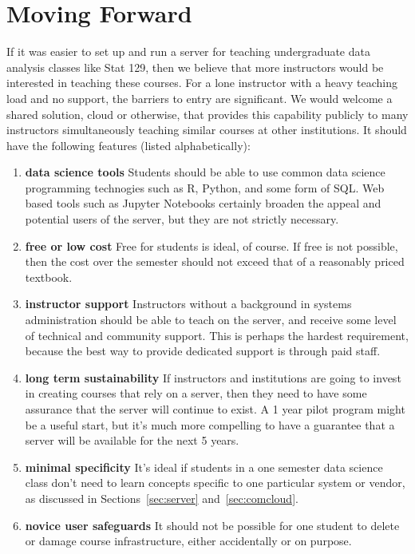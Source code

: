 \documentclass[12pt]{article}
\begin{document}
\section{Moving Forward}

If it was easier to set up and run a server for teaching undergraduate data analysis classes like Stat 129, then we believe that more instructors would be interested in teaching these courses.
For a lone instructor with a heavy teaching load and no support, the barriers to entry are significant.
We would welcome a shared solution, cloud or otherwise, that provides this capability publicly to many instructors simultaneously teaching similar courses at other institutions.
It should have the following features (listed alphabetically):
\begin{enumerate}
\item \textbf{data science tools} Students should be able to use common data science programming technogies such as R, Python, and some form of SQL.
    Web based tools such as Jupyter Notebooks certainly broaden the appeal and potential users of the server, but they are not strictly necessary.
\item \textbf{free or low cost} Free for students is ideal, of course.
    If free is not possible, then the cost over the semester should not exceed that of a reasonably priced textbook.
\item \textbf{instructor support}
    Instructors without a background in systems administration should be able to teach on the server, and receive some level of technical and community support.
    This is perhaps the hardest requirement, because the best way to provide dedicated support is through paid staff.
\item \textbf{long term sustainability} 
    If instructors and institutions are going to invest in creating courses that rely on a server, then they need to have some assurance that the server will continue to exist.
    A 1 year pilot program might be a useful start, but it's much more compelling to have a guarantee that a server will be available for the next 5 years.
\item \textbf{minimal specificity}
    It's ideal if students in a one semester data science class don't need to learn concepts specific to one particular system or vendor, as discussed in Sections~\ref{sec:server} and~\ref{sec:comcloud}.
\item \textbf{novice user safeguards} It should not be possible for one student to delete or damage course infrastructure, either accidentally or on purpose.

\end{enumerate}
\end{document}
